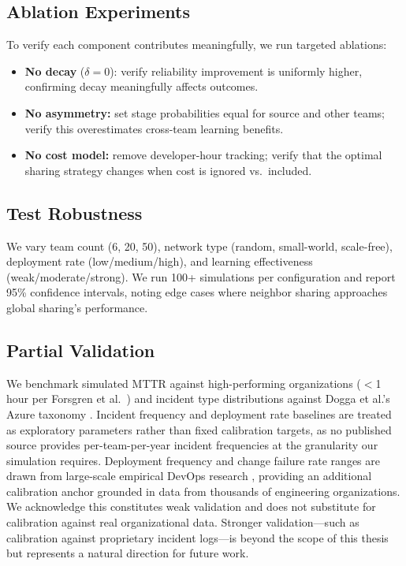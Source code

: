 \documentclass[conference,10pt]{IEEEtran}
\begin{document}
\subsection{Ablation Experiments}

To verify each component contributes meaningfully, we run targeted ablations:
\begin{itemize}
    \item \textbf{No decay} ($\delta = 0$): verify reliability improvement is uniformly higher, confirming decay meaningfully affects outcomes.
    \item \textbf{No asymmetry:} set stage probabilities equal for source and other teams; verify this overestimates cross-team learning benefits.
    \item \textbf{No cost model:} remove developer-hour tracking; verify that the optimal sharing strategy changes when cost is ignored vs.\ included.
\end{itemize}

\subsection{Test Robustness}

We vary team count (6, 20, 50), network type (random, small-world, scale-free), deployment rate (low/medium/high), and learning effectiveness (weak/moderate/strong). We run 100+ simulations per configuration and report 95\% confidence intervals, noting edge cases where neighbor sharing approaches global sharing's performance.

\subsection{Partial Validation}

We benchmark simulated MTTR against high-performing organizations ($<$1 hour per Forsgren et al.\ \cite{forsgren2018}) and incident type distributions against Dogga et al.'s Azure taxonomy \cite{dogga2023}. Incident frequency and deployment rate baselines are treated as exploratory parameters rather than fixed calibration targets, as no published source provides per-team-per-year incident frequencies at the granularity our simulation requires. Deployment frequency and change failure rate ranges are drawn from large-scale empirical DevOps research \cite{forsgren2018}, providing an additional calibration anchor grounded in data from thousands of engineering organizations. We acknowledge this constitutes weak validation and does not substitute for calibration against real organizational data. Stronger validation---such as calibration against proprietary incident logs---is beyond the scope of this thesis but represents a natural direction for future work.
\end{document}
